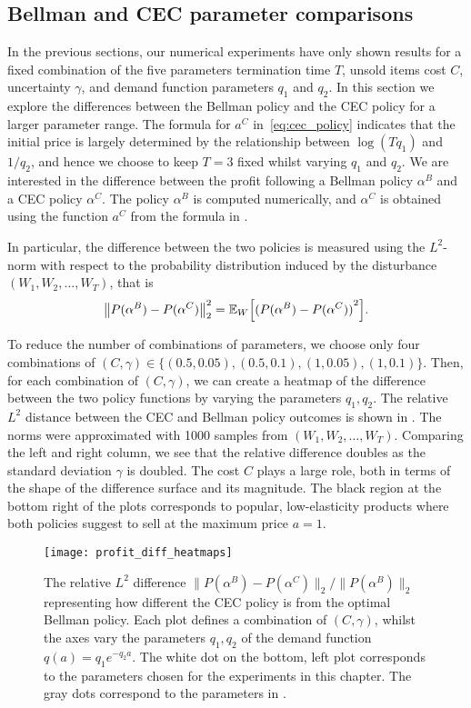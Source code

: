 \documentclass[main.tex]{subfiles}
\begin{document}
\subsection{Bellman and CEC parameter comparisons}\label{sec:parameter_comparison}
In the previous sections, our numerical experiments have only shown
results for a fixed combination of the five parameters
termination time $T$, unsold items cost $C$, uncertainty $\gamma$, and
demand function parameters $q_1$ and $q_2$.
In this section we explore the differences between the Bellman policy
and the CEC policy for a larger parameter range.
The formula for $a^C$ in~\eqref{eq:cec_policy} indicates that the
initial price is largely determined by the relationship between
$\log(Tq_1)$ and $1/q_2$, and hence we choose to keep $T=3$ fixed whilst
varying $q_1$ and $q_2$.
We are interested in the difference between the profit following
a Bellman policy $\alpha^B$ and a CEC policy $\alpha^C$.
The policy $\alpha^B$ is computed numerically, and
$\alpha^C$ is obtained using the function $a^C$ from
the formula in .

In particular, the difference between the two policies is measured
using the $L^2$-norm with respect to the probability distribution
induced by the disturbance $(W_1,W_2,\dots,W_T)$, that is
\begin{equation}
  {\left\|P(\alpha^B)-P(\alpha^C)\right\|}_2^2
  =\mathbb{E}_W\Bigl[{( P(\alpha^B)-P(\alpha^C) )}^2 \Bigr].
\end{equation}

To reduce the number of combinations of parameters, we choose only
four combinations of
$(C,\gamma)\in\{(0.5,0.05),(0.5,0.1),(1,0.05),(1,0.1)\}$.
Then,
for each combination of $(C,\gamma)$,
we can create a heatmap of the difference between the two policy
functions by varying the parameters $q_1,q_2$.
The relative $L^2$ distance between the CEC and Bellman policy outcomes
is shown in . The norms were approximated
with \num{1000} samples from $(W_1,W_2,\dots,W_T)$.
Comparing the left and right column, we see that the relative difference doubles as
the standard deviation $\gamma$ is doubled. The cost $C$ plays a large
role, both in terms of the shape of the difference surface and its
magnitude.
The black region at the bottom right of the plots corresponds to popular,
low-elasticity products where both policies suggest to sell at the
maximum price $a=1$.
\begin{figure}[htbp]
  \texttt{[image: profit\_diff\_heatmaps]}
  \caption{The relative $L^2$ difference
    $\|P(\alpha^B)-P(\alpha^C)\|_2/\|P(\alpha^B)\|_2$ representing
    how different the CEC policy is from the optimal Bellman policy.
    Each plot defines a combination of $(C,\gamma)$, whilst
    the axes vary the parameters $q_1,q_2$ of the demand function
    $q(a)=q_1e^{-q_2a}$.
    The white dot on the bottom, left plot corresponds to the
    parameters chosen for the experiments in this chapter. The gray
    dots correspond to the parameters in .
  }\label{fig:profit_diff_heatmaps}
\end{figure}
\end{document}
